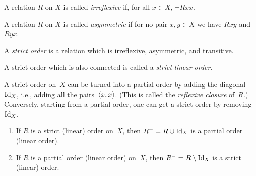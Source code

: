 \documentclass[../../../include/open-logic-section]{subfiles}
\begin{document}
\begin{defn}[Irreflexivity]
A relation $R$ on $X$ is called \emph{irreflexive} if, for all $x \in
X$, $ \lnot Rxx$. 
\end{defn}

\begin{defn}[Asymmetry]
A relation $R$ on $X$ is called \emph{asymmetric} if for no pair $x,y\in
X$ we have $Rxy$ and $Ryx$. 
\end{defn}

\begin{defn}
A \emph{strict order} is a relation which is irreflexive, asymmetric,
and transitive.
\end{defn}

\begin{defn}
A strict order which is also connected is called a
\emph{strict linear order.}
\end{defn}

A strict order on~$X$ can be turned into a partial order
by adding the diagonal $\mathord{\mathrm{Id}_{X}}$, i.e., adding all the pairs~$\langle x,
  x \rangle$.  (This is called the \emph{reflexive closure} of~$R$.)
Conversely, starting from a partial order, one can get a strict
order by removing~$\mathord{\mathrm{Id}_{X}}$.

\begin{prop}
  \begin{enumerate}
  \item If $R$ is a strict (linear) order on~$X$, then $R^+ = R
    \cup \mathord{\mathrm{Id}_{X}}$ is a partial order (linear order).
  \item If $R$ is a partial order (linear order) on~$X$, then $R^- = R
    \setminus \mathord{\mathrm{Id}_{X}}$ is a strict (linear) order.
  \end{enumerate}
\end{prop}
\end{document}
